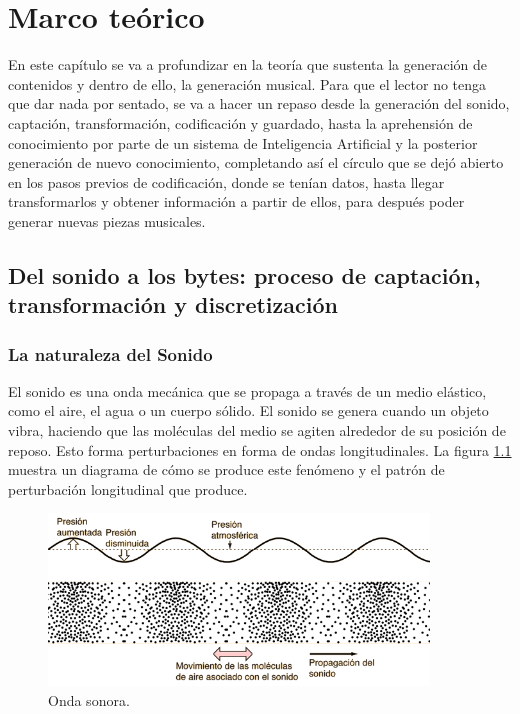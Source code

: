 
\cleardoublepage

\chapter{Marco teórico}

En este capítulo se va a profundizar en la teoría que sustenta la generación de contenidos y dentro de ello, la generación musical. Para que el lector no tenga que dar nada por sentado, se va a hacer un repaso desde la generación del sonido, captación, transformación, codificación y guardado, hasta la aprehensión de conocimiento por parte de un sistema de Inteligencia Artificial y la posterior generación de nuevo conocimiento, completando así el círculo que se dejó abierto en los pasos previos de codificación, donde se tenían datos, hasta llegar transformarlos y obtener información a partir de ellos, para después poder generar nuevas piezas musicales.

\section{Del sonido a los bytes: proceso de captación, transformación y discretización}

\subsection{La naturaleza del Sonido}
El sonido es una onda mecánica que se propaga a través de un medio elástico, como el aire, el agua o un cuerpo sólido. El sonido se genera cuando un objeto vibra, haciendo que las moléculas del medio se agiten alrededor de su posición de reposo. Esto forma perturbaciones en forma de ondas longitudinales. La figura \ref{fig:onda_sonora} muestra un diagrama de cómo se produce este fenómeno y el patrón de perturbación longitudinal que produce.

\begin{figure}[H]
  \centering
  \includegraphics[width=0.9\textwidth]{images/wave.png}
  \caption{Onda sonora.}
  \label{fig:onda_sonora}
\end{figure}

